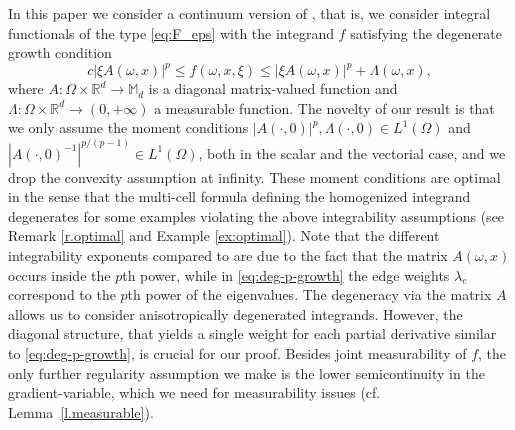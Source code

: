 \documentclass[11pt]{article}
\newcommand{\cf}{cf.\xspace}
\numberwithin{equation}{section}
\theoremstyle{definition}
\let\w\omega
\newcommand{\R}{\mathbb{R}}
\begin{document}
In this paper we consider a continuum version of \cite{NSS}, that is, we consider integral functionals of the type \eqref{eq:F_eps} with the integrand $f$ satisfying the degenerate growth condition\vspace*{-3pt}\enlargethispage{.5\baselineskip}%
\begin{equation}\label{eq:deg-growth}
c|\xi A(\w,x)|^p\leq f(\w,x,\xi)\leq |\xi A(\w,x)|^p+\Lambda(\w,x),
\end{equation}
where $A:\Omega\times\R^d\to \mathbb{M}_{d}$ is a diagonal matrix-valued function and $\Lambda:\Omega\times\R^d\to (0,+\infty)$ a measurable function. The novelty of our result is that we only assume the moment conditions $|A(\cdot,0)|^p,\Lambda(\cdot,0) \in L^1(\Omega)$ and $|A(\cdot,0)^{-1}|^{p/(p-1)}\in L^{1}(\Omega)$, both in the scalar and the vectorial case, and we drop the convexity assumption at infinity. These moment conditions are optimal in the sense that the multi-cell formula defining the homogenized integrand degenerates for some examples violating the above integrability assumptions (see Remark \ref{r.optimal} and Example \ref{ex:optimal}). Note that the different integrability exponents compared to \cite{NSS} are due to the fact that the matrix $A(\w,x)$ occurs inside the $p$th power, while in \eqref{eq:deg-p-growth} the edge weights $\lambda_e$ correspond to the $p$th power of the eigenvalues. The degeneracy via the matrix $A$ allows us to consider anisotropically degen\-er\-ated integrands. However, the diagonal structure, that yields a single weight for each partial derivative similar to \eqref{eq:deg-p-growth}, is crucial for our proof. Besides joint measurability of $f$, the only further regularity assumption we make is the lower semicontinuity in the gradient-variable, which we need for measurability issues (\cf Lemma~\ref{l.measurable}).
\end{document}
